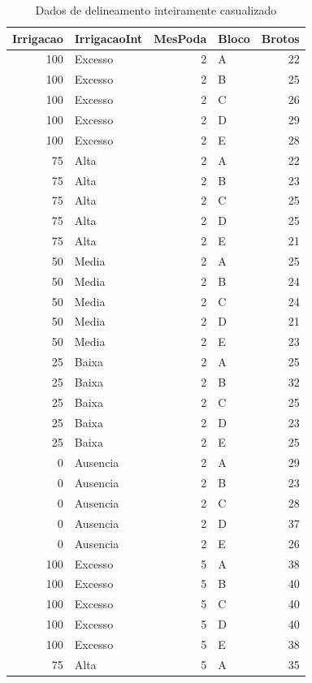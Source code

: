 \documentclass[
]{article}
\begin{document}
\begin{table}

\caption{\label{tab:unnamed-chunk-44}Dados de delineamento inteiramente casualizado}
\centering
\begin{tabular}[t]{r|l|r|l|r}
\hline
Irrigacao & IrrigacaoInt & MesPoda & Bloco & Brotos\\
\hline
100 & Excesso & 2 & A & 22\\
\hline
100 & Excesso & 2 & B & 25\\
\hline
100 & Excesso & 2 & C & 26\\
\hline
100 & Excesso & 2 & D & 29\\
\hline
100 & Excesso & 2 & E & 28\\
\hline
75 & Alta & 2 & A & 22\\
\hline
75 & Alta & 2 & B & 23\\
\hline
75 & Alta & 2 & C & 25\\
\hline
75 & Alta & 2 & D & 25\\
\hline
75 & Alta & 2 & E & 21\\
\hline
50 & Media & 2 & A & 25\\
\hline
50 & Media & 2 & B & 24\\
\hline
50 & Media & 2 & C & 24\\
\hline
50 & Media & 2 & D & 21\\
\hline
50 & Media & 2 & E & 23\\
\hline
25 & Baixa & 2 & A & 25\\
\hline
25 & Baixa & 2 & B & 32\\
\hline
25 & Baixa & 2 & C & 25\\
\hline
25 & Baixa & 2 & D & 23\\
\hline
25 & Baixa & 2 & E & 25\\
\hline
0 & Ausencia & 2 & A & 29\\
\hline
0 & Ausencia & 2 & B & 23\\
\hline
0 & Ausencia & 2 & C & 28\\
\hline
0 & Ausencia & 2 & D & 37\\
\hline
0 & Ausencia & 2 & E & 26\\
\hline
100 & Excesso & 5 & A & 38\\
\hline
100 & Excesso & 5 & B & 40\\
\hline
100 & Excesso & 5 & C & 40\\
\hline
100 & Excesso & 5 & D & 40\\
\hline
100 & Excesso & 5 & E & 38\\
\hline
75 & Alta & 5 & A & 35\\

\end{tabular}
\end{table}
\end{document}
